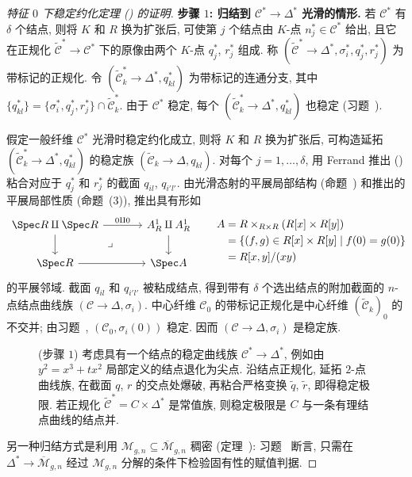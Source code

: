 \begin{proof}[特征 $0$ 下稳定约化定理 () 的证明]
\textbf{步骤 $1$: 归结到 $\mathcal C^*\to\Delta^*$ 光滑的情形.}
若 $\mathcal C^*$ 有 $\delta$ 个结点, 则将 $K$ 和 $R$ 换为扩张后, 可使第 $j$ 个结点由 $K$-点 $n_j^*\in\mathcal C^*$ 给出, 且它在正规化 $\widetilde{\mathcal C}^*\to\mathcal C^*$ 下的原像由两个 $K$-点 $q_j^*$, $r_j^*$ 组成. 称 $(\widetilde{\mathcal C}^*\to\Delta^*,\allowbreak \sigma_i^*,\allowbreak q_j^*,\allowbreak r_j^*)$ 为带标记的正规化. 令 $(\widetilde{\mathcal C}_k^*\to\Delta^*,\allowbreak q_{kl}^*)$ 为带标记的连通分支, 其中 $\{q_{kl}^*\}=\{\sigma_i^*,\allowbreak q_j^*,\allowbreak r_j^*\}\cap\widetilde{\mathcal C}_k^*$. 由于 $\mathcal C^*$ 稳定, 每个 $(\widetilde{\mathcal C}_k^*\to\Delta^*,\allowbreak q_{kl}^*)$ 也稳定 (习题~).

假定一般纤维 $\mathcal C^*$ 光滑时稳定约化成立, 则将 $K$ 和 $R$ 换为扩张后, 可构造延拓 $(\widetilde{\mathcal C}_k^*\to\Delta^*,\allowbreak q_{kl}^*)$ 的稳定族 $(\widetilde{\mathcal C}_k\to\Delta,\allowbreak q_{kl})$. 对每个 $j=1,\allowbreak \ldots,\allowbreak \delta$, 用 Ferrand 推出 () 粘合对应于 $q_j^*$ 和 $r_j^*$ 的截面 $q_{il}$, $q_{i'l'}$. 由光滑态射的平展局部结构 (命题~) 和推出的平展局部性质 (命题~(3)), 推出具有形如
\[
\begin{tikzcd}[column sep=large]
\Spec R\amalg\Spec R\arrow[r,"0\amalg0"]\arrow[d]&\mathbb A_R^1\amalg\mathbb A_R^1\arrow[d]\\
\Spec R\arrow[r]\arrow[ur,phantom,"\lrcorner"]&\Spec A
\end{tikzcd}
\qquad
\begin{aligned}
A&=R\times_{R\times R}(R[x]\times R[y])\\
 &=\{(f,g)\in R[x]\times R[y]\mid f(0)=g(0)\}\\
 &=R[x,y]/(xy)
\end{aligned}
\]
的平展邻域. 截面 $q_{il}$ 和 $q_{i'l'}$ 被粘成结点, 得到带有 $\delta$ 个选出结点的附加截面的 $n$-点结点曲线族 $(\mathcal C\to\Delta,\allowbreak \sigma_i)$. 中心纤维 $\mathcal C_0$ 的带标记正规化是中心纤维 $(\widetilde{\mathcal C}_k)_0$ 的不交并; 由习题~, $(\mathcal C_0,\allowbreak \sigma_i(0))$ 稳定. 因而 $(\mathcal C\to\Delta,\allowbreak \sigma_i)$ 是稳定族.
\begingroup\renewcommand{\thefigure}{6.5.3}\renewcommand{\theHfigure}{6.5.3-figure}
\begin{figure}[H]\centering
\caption{(步骤 $1$) 考虑具有一个结点的稳定曲线族 $\mathcal C^*\to\Delta^*$, 例如由 $y^2=x^3+tx^2$ 局部定义的结点退化为尖点. 沿结点正规化, 延拓 $2$-点曲线族, 在截面 $q$, $r$ 的交点处爆破, 再粘合严格变换 $\widetilde q$, $\widetilde r$, 即得稳定极限. 若正规化 $\widetilde{\mathcal C}^*=C\times\Delta^*$ 是常值族, 则稳定极限是 $C$ 与一条有理结点曲线的结点并.}\label{src:6.5.3-figure}
\end{figure}\endgroup\addtocounter{theorem}{-1}
另一种归结方式是利用 $\mathcal M_{g,\allowbreak n}\subseteq\overline{\mathcal M}_{g,\allowbreak n}$ 稠密 (定理~): 习题~ 断言, 只需在 $\Delta^*\to\overline{\mathcal M}_{g,\allowbreak n}$ 经过 $\mathcal M_{g,\allowbreak n}$ 分解的条件下检验固有性的赋值判据.


\end{proof}
